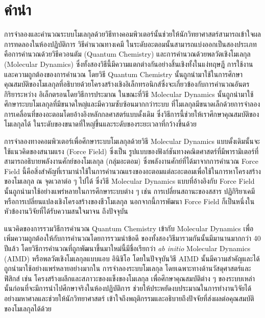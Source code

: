

{

\chapter*{\centering คำนำ}

การจำลองและคำนวณระบบโมเลกุลด้วยวิธีทางคอมพิวเตอร์นั้นช่วยให้นักวิทยาศาสตร์สามารถเข้าใจผลการทดลองในห้องปฏิบัติการ วิธีคำนวณทางเคมี%
ในระดับอะตอมนั้นสามารถแบ่งออกเป็นสองประเภทคือการคำนวณด้วยวิธีควอนตัม (Quantum Chemistry) และการคำนวณด้วยพลวัตเชิงโมเลกุล 
(Molecular Dynamics) ซึ่งทั้งสองวิธีนี้มีความแตกต่างกันอย่างสิ้นเชิงทั้งในแง่ทฤษฎี การใช้งานและความถูกต้องของการคำนวณ โดยวิธี Quantum 
Chemistry นั้นถูกนำมาใช้ในการศึกษาคุณสมบัติของโมเลกุลที่อธิบายด้วยโครงสร้างเชิงอิเล็กทรอนิกส์ซึ่งจะเกี่ยวข้องกับการคำนวณอันตรกิริยาระหว่าง%
อิเล็กตรอนโดยวิธีการประมาณ ในขณะที่วิธี Molecular Dynamics นั้นถูกนำมาใช้ศึกษาระบบโมเลกุลที่มีขนาดใหญ่และมีความซับซ้อนมากกว่าระบบ%
ที่โมเลกุลมีขนาดเล็กด้วยการจำลองการเคลื่อนที่ของอะตอมโดยอ้างอิงหลักกลศาสตร์แบบดั้งเดิม ซึ่งวิธีการนี้ช่วยให้เราศึกษาคุณสมบัติของโมเลกุลได้%
ในระดับของขนาดที่ใหญ่ขึ้นและระดับของระยะเวลาที่กว้างขึ้นด้วย

การจำลองทางคอมพิวเตอร์เพื่อศึกษาระบบโมเลกุลด้วยวิธี Molecular Dynamics แบบดั้งเดิมนั้นจะใช้แนวคิดของสนามแรง (Force Field) ซึ่งเป็น%
รูปแบบของฟังก์ชันทางคณิตศาสตร์ที่มีพารามิเตอร์ที่สามารถอธิบายพลังงานศักย์ของโมเลกุล (กลุ่มอะตอม) ซึ่งพลังงานศักย์ที่ได้มาจากการคำนวณ Force 
Field นี้คือสิ่งสำคัญที่เรามานำใช้ในการคำนวณแรงของอะตอมแต่ละอะตอมเพื่อใช้ในการหาโครงสร้างของโมเลกุล ณ จุดเวลาต่อ ๆ ไปได้ ซึ่งวิธี 
Molecular Dynamics แบบที่อ้างอิงกับ Force Field นั้นถูกนำมาใช้อย่างแพร่หลายในการศึกษาระบบต่าง ๆ เช่น การเปลี่ยนสถานะของสสาร 
ปฏิกิริยาเคมีหรือการเปลี่ยนแปลงเชิงโครงสร้างของชีวโมเลกุล นอกจากนี้การพัฒนา Force Field ก็เป็นหนึ่งในหัวข้องานวิจัยที่ได้รับความสนใจมาจน%
ถึงปัจจุบัน

แนวคิดของการรวมวิธีการคำนวณ Quantum Chemistry เข้ากับ Molecular Dynamics เพื่อเพิ่มความถูกต้องให้กับการคำนวณโดยการรวมนำข้อดี%
ของทั้งสองวิธีมารวมกันนั้นมีมานานมากกว่า 40 ปีแล้ว โดยวิธีการคำนวณที่ถูกพัฒนาขึ้นมาใหม่นี้มีชื่อเรียกว่า \textit{ab initio} Molecular 
Dynamics (AIMD) หรือพลวัตเชิงโมเลกุลแบบแอบ อินิชิโอ โดยในปัจจุบันวิธี AIMD นั้นมีความสำคัญและได้ถูกนำมาใช้อย่างแพร่หลายอย่างมากใน%
การจำลองระบบโมเลกุล โดยเฉพาะทางด้านวัสดุศาสตร์และฟิสิกส์ เช่น โครงสร้างผลึกและสภาวะของแข็งของโมเลกุล เพื่อศึกษาคุณสมบัติต่าง ๆ 
ของระบบเหล่านั้นก่อนที่จะมีการนำไปศึกษาจริงในห้องปฏิบัติการ ช่วยให้ประหยัดงบประมาณในการทำงานวิจัยได้อย่างมหาศาลและช่วยให้นักวิทยาศาสตร์%
เข้าใจถึงพฤติกรรมและอธิบายถึงปัจจัยที่ส่งผลต่อคุณสมบัติของโมเลกุลได้ด้วย 

}
